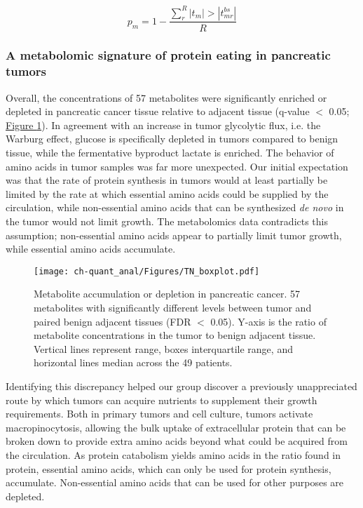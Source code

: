 \begin{equation}
p_{m} = 1 - \frac{\sum_{r}^{R}|t_{m}| > |t_{mr}^{bs}|}{R}\label{ch-quant_anal:bspval}
\end{equation}

\subsubsection{A metabolomic signature of protein eating in pancreatic tumors}

Overall, the concentrations of 57 metabolites were significantly enriched or depleted in pancreatic cancer tissue relative to adjacent tissue (q-value $<$ 0.05; \hyperref[ch-quant_anal:tnboxplot]{Figure \ref{ch-quant_anal:tnboxplot}}).  In agreement with an increase in tumor glycolytic flux, i.e. the Warburg effect, glucose is specifically depleted in tumors compared to benign tissue, while the fermentative byproduct lactate is enriched.  The behavior of amino acids in tumor samples was far more unexpected.  Our initial expectation was that the rate of protein synthesis in tumors would at least partially be limited by the rate at which essential amino acids could be supplied by the circulation, while non-essential amino acids that can be synthesized \textit{de novo} in the tumor would not limit growth. The metabolomics data contradicts this assumption; non-essential amino acids appear to partially limit tumor growth, while essential amino acids accumulate. 

\begin{figure}[h!]
\begin{center}
\texttt{[image: ch-quant\_anal/Figures/TN\_boxplot.pdf]}
\caption[Metabolite accumulation or depletion in pancreatic cancer]{Metabolite accumulation or depletion in pancreatic cancer. 57 metabolites with significantly different levels between tumor and paired benign adjacent tissues (FDR $<$ 0.05). Y-axis is the ratio of metabolite concentrations in the tumor to benign adjacent tissue. Vertical lines represent range, boxes interquartile range, and horizontal lines median across the 49 patients.}
\label{ch-quant_anal:tnboxplot}
\end{center}
\end{figure}

Identifying this discrepancy helped our group discover a previously unappreciated route by which tumors can acquire nutrients to supplement their growth requirements.  Both in primary tumors and cell culture, tumors activate macropinocytosis, allowing the bulk uptake of extracellular protein that can be broken down to provide extra amino acids beyond what could be acquired from the circulation. As protein catabolism yields amino acids in the ratio found in protein, essential amino acids, which can only be used for protein synthesis, accumulate. Non-essential amino acids that can be used for other purposes are depleted.


